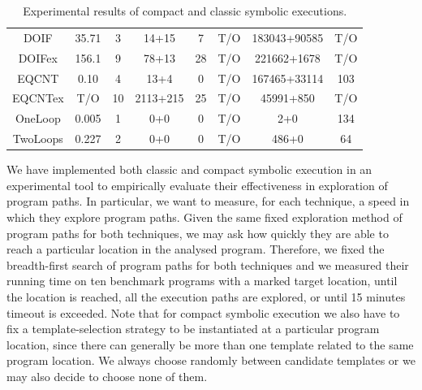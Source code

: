 \documentclass{sig-alternate}%
\begin{document}
\begin{table}[!t]
\begin{center}
\begin{tabular}{|c||c|c|c|c||c|c||c|}
      DOIF    & 35.71 &  3 &    14+15 &   7 &    T/O & 183043+90585 &   T/O \\
      DOIFex  & 156.1 &  9 &    78+13 &  28 &    T/O &  221662+1678 &   T/O \\
      EQCNT   &  0.10 &  4 &     13+4 &   0 &    T/O & 167465+33114 &   103 \\
      \hline
      EQCNTex &   T/O & 10 & 2113+215 &  25 &    T/O &    45991+850 &   T/O \\
      OneLoop & 0.005 &  1 &      0+0 &   0 &    T/O &          2+0 &   134 \\
      TwoLoops& 0.227 &  2 &      0+0 &   0 &    T/O &        486+0 &    64 \\
      \hline
    \end{tabular}  \end{center}
  \caption{Experimental results of compact and classic symbolic  
executions.}
  \label{tab:Expriments}
\end{table}

We have implemented both classic and compact symbolic execution in an
experimental tool to empirically evaluate their effectiveness in
exploration of program paths. In particular, we want to measure, for
each technique, a speed in which they explore program paths. Given the
same fixed exploration method of program paths
for both techniques, we may ask how quickly they are able to
reach a particular location in the analysed program.
%
Therefore, we fixed the breadth-first search of program paths for both
techniques and we measured their running time on ten benchmark
programs with a marked target location, until the location is reached,
all the execution paths are explored, or until 15 minutes timeout is
exceeded. Note that for compact symbolic execution we also have to fix
a template-selection strategy to be instantiated at a particular
program location, since there can generally be more than one template
related to the same program location. We always choose randomly
between candidate templates or we may also decide to choose none of
them.
\end{document}
